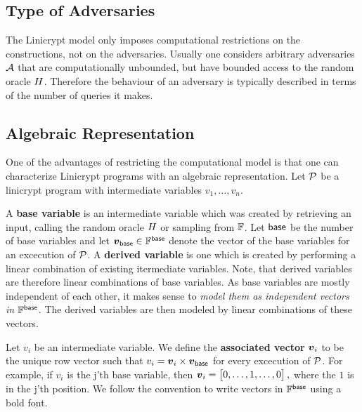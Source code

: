 \subsection{Type of Adversaries}
The Linicrypt model only imposes computational restrictions on the constructions,
not on the adversaries.
Usually one considers arbitrary adversaries $\A$ that are computationally unbounded,
but have bounded access to the random oracle $\H$.
Therefore the behaviour of an adversary is typically described in terms of the number of queries it makes.

\subsection{Algebraic Representation}

One of the advantages of restricting the computational model is that one can characterize
Linicrypt programs with an algebraic representation.
Let $\P$ be a linicrypt program with intermediate variables $v_1, \dots, v_n$.

A \textbf{base variable} is an intermediate variable which was created by retrieving an input,
calling the random oracle $\H$ or sampling from $\F$.
Let $\base$ be the number of base variables
and let $\vbase \in \Base$ denote the vector of the base variables for an excecution of $\P$.
A \textbf{derived variable} is one which is created by performing a linear combination of existing itermediate variables.
Note, that derived variables are therefore linear combinations of base variables.
As base variables are mostly independent of each other,
it makes sense to \emph {model them as independent vectors in $\Base$}.
The derived variables are then modeled by linear combinations of these vectors.

Let $v_i$ be an intermediate variable.
We define the \textbf{associated vector} $\v v_i$ to be the unique row vector such that
$v_i = \v v_i \times \vbase$ for every excecution of $\P$.
For example, if $v_i$ is the j'th base variable, then 
$
  \v v_i = \begin{bmatrix}
  0,\dots,1,\dots,0
  \end{bmatrix},
$
where the $1$ is in the j'th position.
We follow the convention to write vectors in $\Base$ using a bold font.

